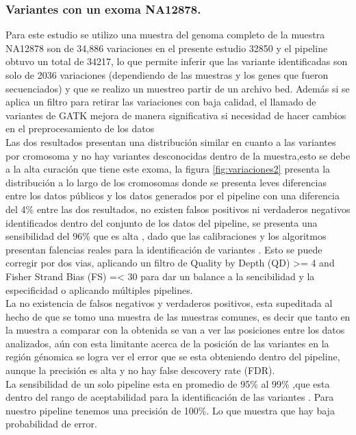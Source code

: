 \subsubsection*{Variantes con un exoma NA12878.}

Para este estudio se utilizo una muestra del genoma completo de la muestra NA12878 son de 34,886 variaciones \cite{Cornish2015} en el presente estudio 32850 y el pipeline obtuvo un total de 34217, lo que permite inferir que las variante identificadas son solo de 2036 variaciones (dependiendo de las muestras y los genes que fueron secuenciados) y que se realizo un muestreo partir de un archivo bed. Además si se aplica un filtro para retirar las variaciones con baja calidad, el llamado de variantes de GATK mejora de manera significativa si necesidad de hacer cambios en el preprocesamiento de los datos \cite{Warden2014} \\

Las dos resultados presentan una distribución similar en cuanto a las variantes por cromosoma y no hay variantes desconocidas dentro de la muestra,esto se debe a la alta curación que tiene este exoma, la figura \ref{fig:variaciones2} presenta la distribución a lo largo de los cromosomas donde se presenta leves diferencias entre los datos públicos y los datos generados por el pipeline con una diferencia del 4\% entre las dos resultados, no existen falsos positivos ni verdaderos negativos identificados dentro del conjunto de los datos del pipeline, se presenta una sensibilidad del 96\% que es alta , dado que las calibraciones y los algoritmos presentan falencias reales para la identificación de variantes \cite{Auwera2014}. Esto se puede corregir por dos vias, aplicando un filtro de Quality by Depth (QD) >= 4 and Fisher Strand Bias (FS) =< 30 para dar un balance  a la sencibilidad y la especificidad \cite{Tsai2016} o aplicando múltiples pipelines.\\

La no existencia de falsos negativos y verdaderos positivos, esta supeditada al hecho de que se tomo una muestra de las muestras comunes, es decir que tanto en la muestra a comparar con la obtenida se van a ver las posiciones entre los datos analizados, aún con esta limitante acerca de la posición de las variantes en la región génomica se logra ver el error que se esta obteniendo dentro del pipeline, aunque la precisión es alta y no hay false descovery rate (FDR).\\

La sensibilidad de un solo pipeline esta en promedio de 95\% al 99\% ,que esta dentro del rango de aceptabilidad para la identificación de las variantes \cite{Liu2013}. Para nuestro pipeline tenemos una precisión de 100\%. Lo que muestra que hay baja probabilidad de error.\\

